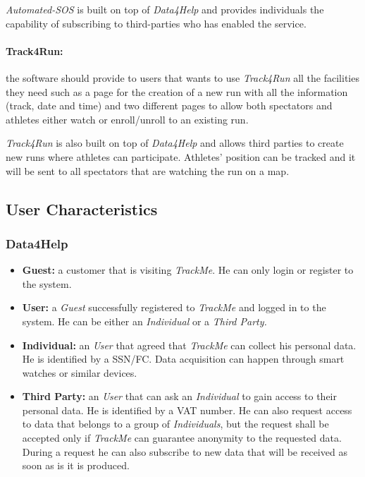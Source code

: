 \documentclass[a4paper]{article}
\begin{document}
    \textit{Automated-SOS} is built on top of \textit{Data4Help} and provides individuals the capability of subscribing to third-parties who has enabled the service.
    
    \paragraph{Track4Run: } the software should provide to users that wants to use \textit{Track4Run} all the facilities they need such as a page for the creation of a new run with all the information (track, date and time) and two different pages to allow both spectators and athletes either watch or enroll/unroll to an existing run.
    
    \textit{Track4Run} is also built on top of \textit{Data4Help} and allows third parties to create new runs where athletes can participate. Athletes' position can be tracked and it will be sent to all spectators that are watching the run on a map.
    
    \subsection{User Characteristics}
        \subsubsection{Data4Help}
        \begin{itemize}
            \item \textbf{Guest:} a customer that is visiting \textit{TrackMe}. He can only login or register to the system.
            \item \textbf{User:} a \textit{Guest} successfully registered to \textit{TrackMe} and logged in to the system. He can be either an \textit{Individual} or a \textit{Third Party.}
            \item \textbf{Individual:} an \textit{User} that agreed that \textit{TrackMe} can collect his personal data. He is identified by a SSN/FC. Data acquisition can happen through smart watches or similar devices.
            \item \textbf{Third Party:} an \textit{User} that can ask an \textit{Individual} to gain access to their personal data. He is identified by a VAT number. He can also request access to data that belongs to a group of \textit{Individuals}, but the request shall be accepted only if \textit{TrackMe} can guarantee anonymity to the requested data. During a request he can also subscribe to new data that will be received as soon as is it is produced.
        \end{itemize}
\end{document}
